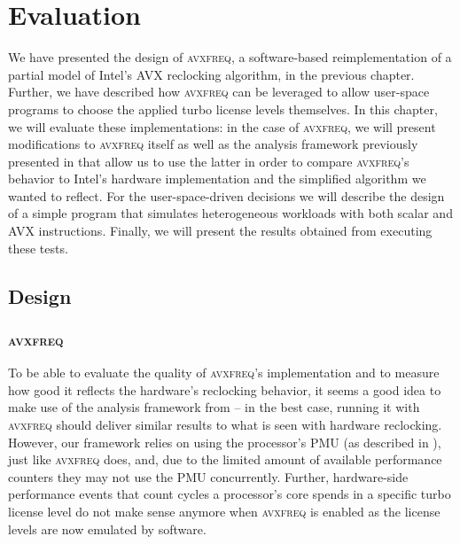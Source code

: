\chapter{Evaluation}
\label{sec:evaluation}

We have presented the design of \textsc{avxfreq}, a software-based reimplementation of a partial model of Intel's \gls{AVX} reclocking algorithm, in the previous chapter. Further, we have described how \textsc{avxfreq} can be leveraged to allow user-space programs to choose the applied turbo license levels themselves. In this chapter, we will evaluate these implementations: in the case of \textsc{avxfreq}, we will present modifications to \textsc{avxfreq} itself as well as the analysis framework previously presented in  that allow us to use the latter in order to compare \textsc{avxfreq}'s behavior to Intel's hardware implementation and the simplified algorithm we wanted to reflect. For the user-space-driven decisions we will describe the design of a simple program that simulates heterogeneous workloads with both scalar and \gls{AVX} instructions. Finally, we will present the results obtained from executing these tests.

\section{Design}
\label{sec:evaluation:design}


\subsection{\textsc{avxfreq}}
\label{sec:evaluation:design:avxfreq}

To be able to evaluate the quality of \textsc{avxfreq}'s implementation and to measure how good it reflects the hardware's reclocking behavior, it seems a good idea to make use of the analysis framework from  -- in the best case, running it with \textsc{avxfreq} should deliver similar results to what is seen with hardware reclocking. However, our framework relies on using the processor's \gls{PMU} (as described in ), just like \textsc{avxfreq} does, and, due to the limited amount of available performance counters they may not use the \gls{PMU} concurrently. Further, hardware-side performance events that count cycles a processor's core spends in a specific turbo license level do not make sense anymore when \textsc{avxfreq} is enabled as the license levels are now emulated by software.

